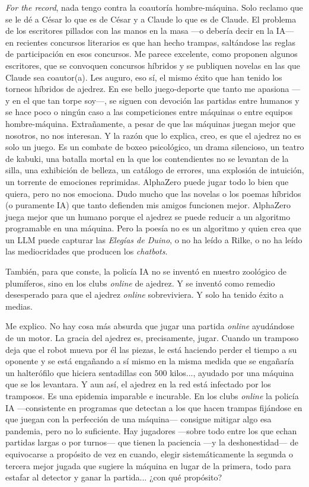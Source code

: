 \documentclass[11pt,a4paper]{article}
\begin{document}
\emph{For the record}, nada tengo contra la coautoría hombre-máquina. Solo reclamo que se le dé a César lo que es de César y a Claude lo que es de Claude. El problema de los escritores pillados con las manos en la masa ---o debería decir en la IA--- en recientes concursos literarios es que han hecho trampas, saltándose las reglas de participación en esos concursos. Me parece excelente, como proponen algunos escritores, que se convoquen concursos híbridos y se publiquen novelas en las que Claude sea coautor(a). Les auguro, eso sí, el mismo éxito que han tenido los torneos híbridos de ajedrez. En ese bello juego-deporte que tanto me apasiona ---y en el que tan torpe soy---, se siguen con devoción las partidas entre humanos y se hace poco o ningún caso a las competiciones entre máquinas o entre equipos hombre-máquina. Extrañamente, a pesar de que las máquinas juegan mejor que nosotros, no nos interesan. Y la razón que lo explica, creo, es que el ajedrez no es solo un juego. Es un combate de boxeo psicológico, un drama silencioso, un teatro de kabuki, una batalla mortal en la que los contendientes no se levantan de la silla, una exhibición de belleza, un catálogo de errores, una explosión de intuición, un torrente de emociones reprimidas. AlphaZero puede jugar todo lo bien que quiera, pero no nos emociona. Dudo mucho que las novelas o los poemas híbridos (o puramente IA) que tanto defienden mis amigos funcionen mejor. AlphaZero juega mejor que un humano porque el ajedrez se puede reducir a un algoritmo programable en una máquina. Pero la poesía no es un algoritmo y quien crea que un LLM puede capturar las \emph{Elegías de Duino}, o no ha leído a Rilke, o no ha leído las mediocridades que producen los \emph{chatbots}.

También, para que conste, la policía IA no se inventó en nuestro zoológico de plumíferos, sino en los clubs \emph{online} de ajedrez. Y se inventó como remedio desesperado para que el ajedrez \emph{online} sobreviviera. Y solo ha tenido éxito a medias.

Me explico. No hay cosa más absurda que jugar una partida \emph{online} ayudándose de un motor. La gracia del ajedrez es, precisamente, jugar. Cuando un tramposo deja que el robot mueva por él las piezas, le está haciendo perder el tiempo a su oponente y se está engañando a sí mismo en la misma medida que se engañaría un halterófilo que hiciera sentadillas con 500 kilos..., ayudado por una máquina que se los levantara. Y aun así, el ajedrez en la red está infectado por los tramposos. Es una epidemia imparable e incurable. En los clubs \emph{online} la policía IA ---consistente en programas que detectan a los que hacen trampas fijándose en que juegan con la perfección de una máquina--- consigue mitigar algo esa pandemia, pero no lo suficiente. Hay jugadores ---sobre todo entre los que echan partidas largas o por turnos--- que tienen la paciencia ---y la deshonestidad--- de equivocarse a propósito de vez en cuando, elegir sistemáticamente la segunda o tercera mejor jugada que sugiere la máquina en lugar de la primera, todo para estafar al detector y ganar la partida... ¿con qué propósito?
\end{document}
